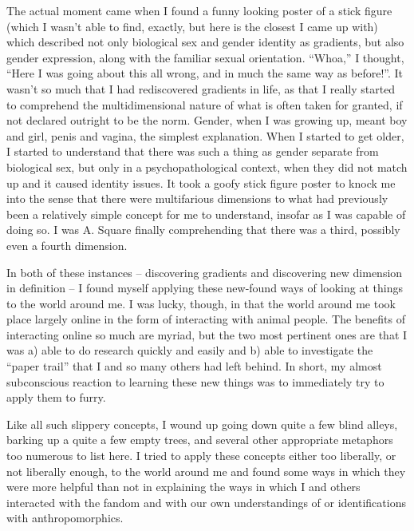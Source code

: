 The actual moment came when I found a funny looking poster of a stick figure (which I wasn't able to find, exactly, but here is the closest I came up with) which described not only biological sex and gender identity as gradients, but also gender expression, along with the familiar sexual orientation.  ``Whoa,'' I thought, ``Here I was going about this all wrong, and in much the same way as before!''.  It wasn't so much that I had rediscovered gradients in life, as that I really started to comprehend the multidimensional nature of what is often taken for granted, if not declared outright to be the norm.  Gender, when I was growing up, meant boy and girl, penis and vagina, the simplest explanation.  When I started to get older, I started to understand that there was such a thing as gender separate from biological sex, but only in a psychopathological context, when they did not match up and it caused identity issues.  It took a goofy stick figure poster to knock me into the sense that there were multifarious dimensions to what had previously been a relatively simple concept for me to understand, insofar as I was capable of doing so.  I was A. Square finally comprehending that there was a third, possibly even a fourth dimension.

In both of these instances -- discovering gradients and discovering new dimension in definition -- I found myself applying these new-found ways of looking at things to the world around me.  I was lucky, though, in that the world around me took place largely online in the form of interacting with animal people.  The benefits of interacting online so much are myriad, but the two most pertinent ones are that I was a) able to do research quickly and easily and b) able to investigate the ``paper trail'' that I and so many others had left behind.  In short, my almost subconscious reaction to learning these new things was to immediately try to apply them to furry.

Like all such slippery concepts, I wound up going down quite a few blind alleys, barking up a quite a few empty trees, and several other appropriate metaphors too numerous to list here.  I tried to apply these concepts either too liberally, or not liberally enough, to the world around me and found some ways in which they were more helpful than not in explaining the ways in which I and others interacted with the fandom and with our own understandings of or identifications with anthropomorphics.

